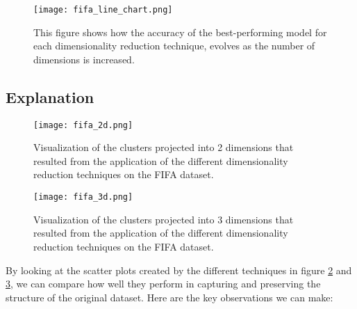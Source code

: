 \begin{figure}[!ht]
    \centering
    \texttt{[image: fifa\_line\_chart.png]}
    \caption{This figure shows how the accuracy of the best-performing model for each dimensionality reduction technique, evolves as the number of dimensions is increased.}
    \label{fig:fifa_line_chart}
\end{figure}


\subsection{Explanation}

\begin{figure}[!ht]
    \centering
    \texttt{[image: fifa\_2d.png]}
    \caption{Visualization of the clusters projected into 2 dimensions that resulted from the application of the different dimensionality reduction techniques on the FIFA dataset.}
    \label{fig:fifa_2d}
\end{figure}

\begin{figure}[!ht]
    \centering
    \texttt{[image: fifa\_3d.png]}
    \caption{Visualization of the clusters projected into 3 dimensions that resulted from the application of the different dimensionality reduction techniques on the FIFA dataset.}
    \label{fig:fifa_3d}
\end{figure}

By looking at the scatter plots created by the different techniques in figure \ref{fig:fifa_2d} and \ref{fig:fifa_3d}, we can compare how well they perform in capturing and preserving the structure of the original dataset. Here are the key observations we can make:

